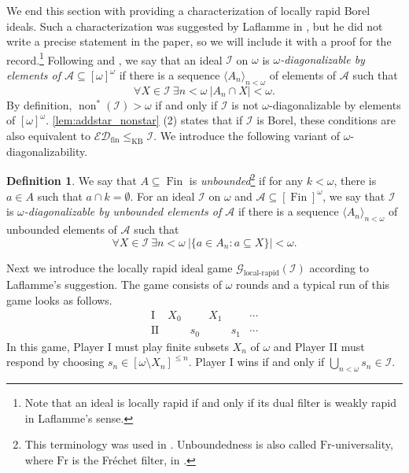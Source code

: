 \documentclass[a4paper,12pt]{amsart}
\theoremstyle{definition}
\newtheorem{dfn}[thm]{Definition}
\numberwithin{thm}{section}
\numberwithin{equation}{section}
\DeclareMathOperator{\non}{non}
\newcommand{\I}{\mathscr{I}}
\DeclareMathOperator{\Fin}{Fin}
\newcommand{\edfin}{\mathcal{ED}_\mathrm{fin}}
\renewcommand{\subset}{\subseteq}
\begin{document}
    We end this section with providing a characterization of locally rapid Borel ideals. Such a characterization was suggested by Laflamme in \cite[Section 4]{Laf96}, but he did not write a precise statement in the paper, so we will include it with a proof for the record.\footnote{Note that an ideal is locally rapid if and only if its dual filter is weakly rapid in Laflamme's sense.} Following \cite{Laf96} and \cite{KZ17}, we say that an ideal $\I$ on $\omega$ is \emph{$\omega$-diagonalizable by elements of $\mathcal{A}\subset[\omega]^{\omega}$} if there is a sequence $\langle A_n\rangle_{n<\omega}$ of elements of $\mathcal{A}$ such that
    \[
    \forall X\in\I~\exists n<\omega~\lvert A_n\cap X\rvert<\omega.
    \]
    By definition, $\non^*(\I) > \omega$ if and only if $\I$ is not $\omega$-diagonalizable by elements of $[\omega]^\omega$. \cref{lem:addstar_nonstar} (2) states that if $\I$ is Borel, these conditions are also equivalent to $\edfin\leq_{\mathrm{KB}}\I$. We introduce the following variant of $\omega$-diagonalizability.

    \begin{dfn}
        We say that $A\subset\Fin$ is \emph{unbounded}\footnote{This terminology was used in \cite{HMM10}. Unboundedness is also called $\mathrm{Fr}$-universality, where $\mathrm{Fr}$ is the Fr\'echet filter, in \cite{Laf96}.} if for any $k<\omega$, there is $a\in A$ such that $a\cap k = \emptyset$. For an ideal $\I$ on $\omega$ and $\mathcal{A}\subset [\Fin]^{\omega}$, we say that $\I$ is \emph{$\omega$-diagonalizable by unbounded elements of $\mathcal{A}$} if there is a sequence $\langle A_n\rangle_{n<\omega}$ of unbounded elements of $\mathcal{A}$ such that
        \[
        \forall X\in\I~\exists n<\omega~\lvert\{a\in A_n: a\subset X\}\rvert < \omega.
        \]
    \end{dfn}
    
    Next we introduce the locally rapid ideal game $\mathcal{G}_{\textrm{local-rapid}}(\I)$ according to Laflamme's suggestion. The game consists of $\omega$ rounds and a typical run of this game looks as follows.
    \[
    \begin{array}{c|ccccc}
        \mathrm{I} & X_0 & & X_1 & & \cdots \\ \hline
        \mathrm{II} & & s_0 & & s_1 & \cdots
    \end{array}
    \]
    In this game, Player I must play finite subsets $X_n$ of $\omega$ and Player II must respond by choosing $s_n \in [\omega\setminus X_n]^{\leq n}$. Player I wins if and only if $\bigcup_{n<\omega}s_n\in\I$.
\end{document}
